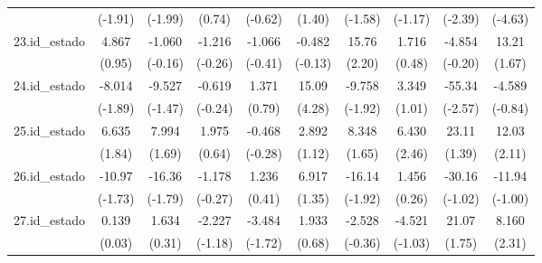 {\begin{tabular}{l*{9}{c}}
            &     (-1.91)         &     (-1.99)         &      (0.74)         &     (-0.62)         &      (1.40)         &     (-1.58)         &     (-1.17)         &     (-2.39)         &     (-4.63)         \\
[1em]
23.id\_estado&       4.867         &      -1.060         &      -1.216         &      -1.066         &      -0.482         &       15.76\sym{*}  &       1.716         &      -4.854         &       13.21         \\
            &      (0.95)         &     (-0.16)         &     (-0.26)         &     (-0.41)         &     (-0.13)         &      (2.20)         &      (0.48)         &     (-0.20)         &      (1.67)         \\
[1em]
24.id\_estado&      -8.014         &      -9.527         &      -0.619         &       1.371         &       15.09\sym{***}&      -9.758         &       3.349         &      -55.34\sym{*}  &      -4.589         \\
            &     (-1.89)         &     (-1.47)         &     (-0.24)         &      (0.79)         &      (4.28)         &     (-1.92)         &      (1.01)         &     (-2.57)         &     (-0.84)         \\
[1em]
25.id\_estado&       6.635         &       7.994         &       1.975         &      -0.468         &       2.892         &       8.348         &       6.430\sym{*}  &       23.11         &       12.03\sym{*}  \\
            &      (1.84)         &      (1.69)         &      (0.64)         &     (-0.28)         &      (1.12)         &      (1.65)         &      (2.46)         &      (1.39)         &      (2.11)         \\
[1em]
26.id\_estado&      -10.97         &      -16.36         &      -1.178         &       1.236         &       6.917         &      -16.14         &       1.456         &      -30.16         &      -11.94         \\
            &     (-1.73)         &     (-1.79)         &     (-0.27)         &      (0.41)         &      (1.35)         &     (-1.92)         &      (0.26)         &     (-1.02)         &     (-1.00)         \\
[1em]
27.id\_estado&       0.139         &       1.634         &      -2.227         &      -3.484         &       1.933         &      -2.528         &      -4.521         &       21.07         &       8.160\sym{*}  \\
            &      (0.03)         &      (0.31)         &     (-1.18)         &     (-1.72)         &      (0.68)         &     (-0.36)         &     (-1.03)         &      (1.75)         &      (2.31)         \\

\end{tabular}}
